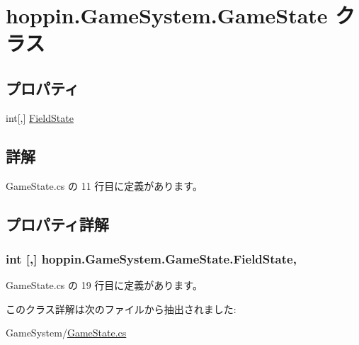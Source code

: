 \hypertarget{classhoppin_1_1_game_system_1_1_game_state}{}\section{hoppin.\+Game\+System.\+Game\+State クラス}
\label{classhoppin_1_1_game_system_1_1_game_state}
\subsection*{プロパティ}
\begin{DoxyCompactItemize}
\item 
int\mbox{[},\mbox{]} \hyperlink{classhoppin_1_1_game_system_1_1_game_state_a18a883396bbe4129385e35f3c393adc1}{Field\+State}
\end{DoxyCompactItemize}


\subsection{詳解}


 Game\+State.\+cs の 11 行目に定義があります。



\subsection{プロパティ詳解}
\subsubsection[{\texorpdfstring{Field\+State}{FieldState}}]{\setlength{\rightskip}{0pt plus 5cm}int \mbox{[},\mbox{]} hoppin.\+Game\+System.\+Game\+State.\+Field\+State\hspace{0.3cm}{\ttfamily [get]}, {\ttfamily [set]}}\hypertarget{classhoppin_1_1_game_system_1_1_game_state_a18a883396bbe4129385e35f3c393adc1}{}\label{classhoppin_1_1_game_system_1_1_game_state_a18a883396bbe4129385e35f3c393adc1}


 Game\+State.\+cs の 19 行目に定義があります。



このクラス詳解は次のファイルから抽出されました\+:\begin{DoxyCompactItemize}
\item 
Game\+System/\hyperlink{_game_state_8cs}{Game\+State.\+cs}\end{DoxyCompactItemize}
